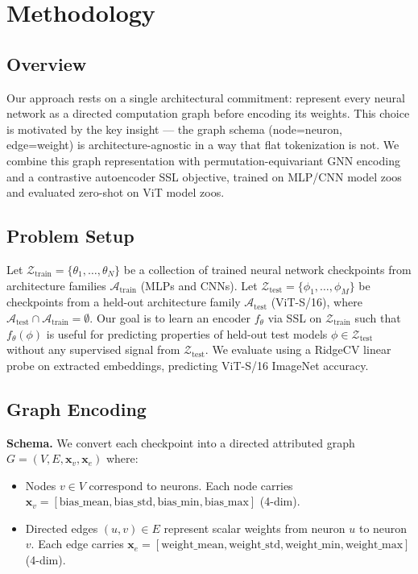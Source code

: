 \section{Methodology}
\label{sec:method}

\subsection{Overview}

Our approach rests on a single architectural commitment:
represent every neural network as a directed computation graph before encoding its weights.
This choice is motivated by the key insight ---
the graph schema (node=neuron, edge=weight) is architecture-agnostic in a way that flat
tokenization is not.
We combine this graph representation with permutation-equivariant GNN encoding and a
contrastive autoencoder SSL objective, trained on MLP/CNN model zoos and evaluated
zero-shot on ViT model zoos.

\subsection{Problem Setup}

Let $\mathcal{Z}_\text{train} = \{\theta_1, \ldots, \theta_N\}$ be a collection of trained
neural network checkpoints from architecture families $\mathcal{A}_\text{train}$
(MLPs and CNNs).
Let $\mathcal{Z}_\text{test} = \{\phi_1, \ldots, \phi_M\}$ be checkpoints from a held-out
architecture family $\mathcal{A}_\text{test}$ (ViT-S/16),
where $\mathcal{A}_\text{test} \cap \mathcal{A}_\text{train} = \emptyset$.
Our goal is to learn an encoder $f_\theta$ via SSL on $\mathcal{Z}_\text{train}$ such that
$f_\theta(\phi)$ is useful for predicting properties of held-out test models
$\phi \in \mathcal{Z}_\text{test}$ without any supervised signal from $\mathcal{Z}_\text{test}$.
We evaluate using a RidgeCV linear probe on extracted embeddings,
predicting ViT-S/16 ImageNet accuracy.

\subsection{Graph Encoding}

\textbf{Schema.}
We convert each checkpoint into a directed attributed graph $G = (V, E, \mathbf{x}_v, \mathbf{x}_e)$
where:
\begin{itemize}
  \item Nodes $v \in V$ correspond to neurons.
        Each node carries $\mathbf{x}_v = [\text{bias\_mean}, \text{bias\_std},
        \text{bias\_min}, \text{bias\_max}]$ (4-dim).
  \item Directed edges $(u, v) \in E$ represent scalar weights from neuron $u$ to neuron $v$.
        Each edge carries $\mathbf{x}_e = [\text{weight\_mean}, \text{weight\_std},
        \text{weight\_min}, \text{weight\_max}]$ (4-dim).
\end{itemize}

